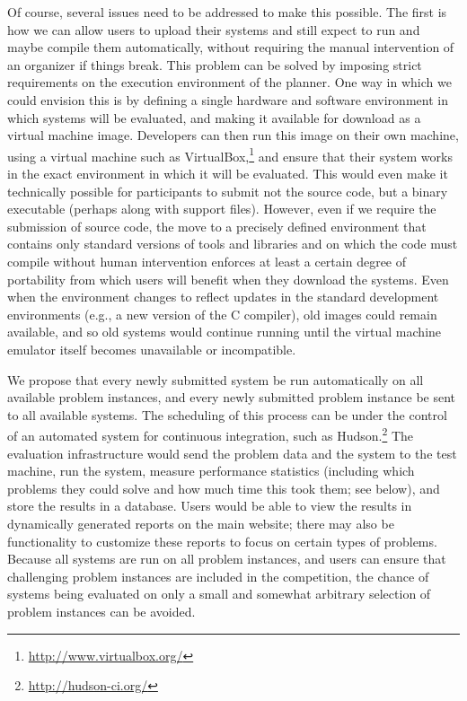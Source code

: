 Of course, several issues need to be addressed to make this possible.
The first is how we can allow users to upload their systems and still
expect to run and maybe compile them automatically, without requiring
the manual intervention of an organizer if things break.  This problem
can be solved by imposing strict requirements on the execution
environment of the planner.  One way in which we could envision this
is by defining a single hardware and software environment in which
systems will be evaluated, and making it available for download as a
virtual machine image.  Developers can then run this image on their
own machine, using a virtual machine such as
VirtualBox,\footnote{\url{http://www.virtualbox.org/}} and ensure
that their system works in the exact environment in which it will be
evaluated.  This would even make it technically possible for
participants to submit not the source code, but a binary executable
(perhaps along with support files).  However, even if we require the
submission of source code, the move to a precisely defined environment
that contains only standard versions of tools and libraries and on
which the code must compile without human intervention enforces at
least a certain degree of portability from which users will benefit
when they download the systems.  Even when the environment changes to
reflect updates in the standard development environments (e.g., a new version
of the C compiler), old images could remain available, and so
old systems would continue running until the virtual machine emulator
itself becomes unavailable or incompatible.

We propose that every newly submitted system be run automatically on
all available problem instances, and every newly submitted problem
instance be sent to all available systems.  The scheduling of this
process can be under the control of an automated system for continuous
integration, such as Hudson.\footnote{\url{http://hudson-ci.org/}} The
evaluation infrastructure would send the problem data and the system to the
test machine, run the system, measure performance statistics
(including which problems they could solve and how much time this took
them; see below), and store the results in a database. Users would be
able to view the results in dynamically generated reports on the main
website; there may also be functionality to customize these reports to
focus on certain types of problems.  Because all systems are run on
all problem instances, and users can ensure that challenging problem
instances are included in the competition, the chance of systems being
evaluated on only a small and somewhat arbitrary selection of problem
instances \cite{pg2008002} can be avoided.

